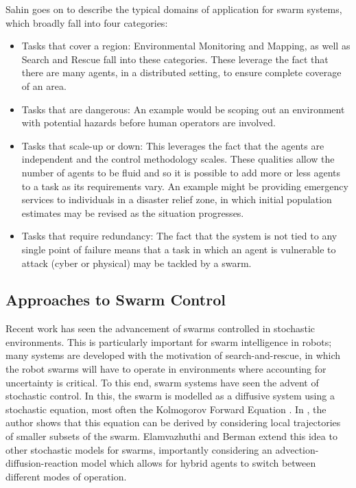 \documentclass[.../main.tex]{subfiles}
\begin{document}
Sahin goes on to describe the typical domains of application for swarm systems, which broadly fall
into four categories:

\begin{itemize}
    \item Tasks that cover a region: Environmental Monitoring and Mapping, as well as Search and
    Rescue fall into these categories. These leverage the fact that there are many agents, in a
    distributed setting, to ensure complete coverage of an area.
    \item Tasks that are dangerous: An example would be scoping out an environment with potential
    hazards before human operators are involved.
    \item Tasks that scale-up or down: This leverages the fact that the agents are independent and
    the control methodology scales. These qualities allow the number of agents to be fluid and so
    it is possible to add more or less agents to a task as its requirements vary. An example might
    be providing emergency services to individuals in a disaster relief zone, in which initial
    population estimates may be revised as the situation progresses.
    \item Tasks that require redundancy: The fact that the system is not tied to any single point of
    failure means that a task in which an agent is vulnerable to attack (cyber or physical) may be
    tackled by a swarm.
\end{itemize}

\subsection{Approaches to Swarm Control} \label{sec::Swarm Control}

Recent work has seen the advancement of swarms controlled in stochastic environments. This is
particularly important for swarm intelligence in robots; many systems are developed with the
motivation of search-and-rescue, in which the robot swarms will have to operate in environments
where accounting for uncertainty is critical. To this end, swarm systems have seen the advent of
stochastic control. In this, the swarm is modelled as a diffusive system using a stochastic
equation, most often the Kolmogorov Forward Equation \cite{Hamann2008}. In \cite{Hamann2008}, the
author shows that this equation can be derived by considering local trajectories of smaller subsets
of the swarm. Elamvazhuthi and Berman \cite{Elamvazhuthi2019} extend this idea to other stochastic
models for swarms, importantly considering an advection-diffusion-reaction model which allows for
hybrid agents to switch between different modes of operation. 
\end{document}
